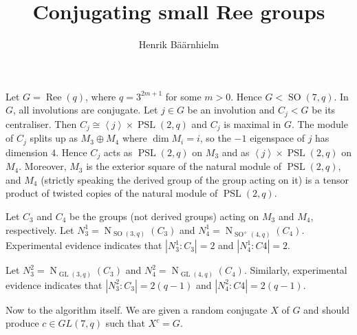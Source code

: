 \documentclass[twoside,a4paper,reqno,psamsfonts]{amsart}
\title{Conjugating small Ree groups}
\author{Henrik B\"a\"arnhielm}
\numberwithin{equation}{section}
\numberwithin{figure}{section}
\newcounter{algorithm}
\theoremstyle{plain}
\theoremstyle{definition}
\theoremstyle{remark}
\providecommand{\abs}[1]{\left\lvert #1 \right\rvert}
\providecommand{\gen}[1]{\left\langle #1 \right\rangle}
\DeclareMathOperator{\GL}{GL}
\DeclareMathOperator{\SO}{SO}
\DeclareMathOperator{\PSL}{PSL}
\DeclareMathOperator{\Ree}{Ree}
\DeclareMathOperator{\Norm}{N}
\begin{document}


\maketitle

Let $G = \Ree(q)$, where $q = 3^{2 m + 1}$ for some $m > 0$. Hence $G
< \SO(7, q)$. In $G$, all involutions are conjugate. Let $j \in G$ be
an involution and $C_j < G$ be its centraliser. Then $C_j \cong
\gen{j} \times \PSL(2, q)$ and $C_j$ is maximal in $G$. The module of
$C_j$ splits up as $M_3 \oplus M_4$ where $\dim M_i = i$, so the $-1$
eigenspace of $j$ has dimension $4$. Hence $C_j$ acts as $\PSL(2,q)$
on $M_3$ and as $\gen{j} \times \PSL(2,q)$ on $M_4$. Moreover, $M_3$
is the exterior square of the natural module of $\PSL(2,q)$, and $M_4$
(strictly speaking the derived group of the group acting on it) is a
tensor product of twisted copies of the natural module of $\PSL(2, q)$.

Let $C_3$ and $C_4$ be the groups (not derived groups) acting on $M_3$ and $M_4$, respectively. Let $N_3^1 = \Norm_{\SO(3, q)}(C_3)$ and $N_4^1 = \Norm_{\SO^{+}(4, q)}(C_4)$. Experimental evidence indicates that
$\abs{N_3^1 : C_3} = 2$ and $\abs{N_4^1 : C4} = 2$.

Let $N_3^2 = \Norm_{\GL(3, q)}(C_3)$ and $N_4^2 = \Norm_{\GL(4, q)}(C_4)$. Similarly, experimental evidence indicates that $\abs{N_3^2 : C_3} = 2(q-1)$ and $\abs{N_4^2 : C4} = 2(q-1)$.





Now to the algorithm itself. We are given a random conjugate $X$ of $G$ and should produce $c \in GL(7, q)$ such that $X^c = G$.

\end{document}
